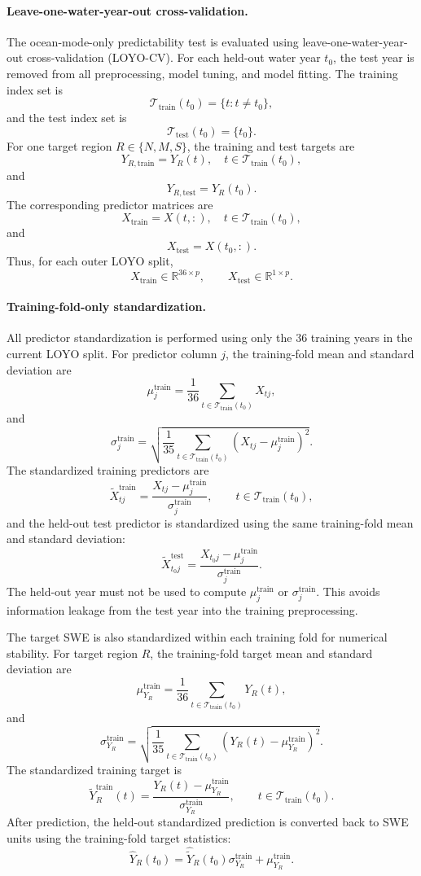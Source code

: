 \documentclass[11pt]{article}
\begin{document}
\paragraph{Leave-one-water-year-out cross-validation.}
The ocean-mode-only predictability test is evaluated using leave-one-water-year-out cross-validation
(LOYO-CV). For each held-out water year $t_0$, the test year is removed from all preprocessing,
model tuning, and model fitting. The training index set is
\[
\mathcal{T}_{\mathrm{train}}(t_0)=\{t: t\neq t_0\},
\]
and the test index set is
\[
\mathcal{T}_{\mathrm{test}}(t_0)=\{t_0\}.
\]
For one target region $R\in\{N,M,S\}$, the training and test targets are
\[
Y_{R,\mathrm{train}}=Y_R(t), \quad t\in \mathcal{T}_{\mathrm{train}}(t_0),
\]
and
\[
Y_{R,\mathrm{test}}=Y_R(t_0).
\]
The corresponding predictor matrices are
\[
X_{\mathrm{train}}=X(t,:), \quad t\in \mathcal{T}_{\mathrm{train}}(t_0),
\]
and
\[
X_{\mathrm{test}}=X(t_0,:).
\]
Thus, for each outer LOYO split,
\[
X_{\mathrm{train}}\in\mathbb{R}^{36\times p},
\qquad
X_{\mathrm{test}}\in\mathbb{R}^{1\times p}.
\]

\paragraph{Training-fold-only standardization.}
All predictor standardization is performed using only the 36 training years in the current LOYO
split. For predictor column $j$, the training-fold mean and standard deviation are
\[
\mu^{\mathrm{train}}_j
=
\frac{1}{36}
\sum_{t\in \mathcal{T}_{\mathrm{train}}(t_0)} X_{tj},
\]
and
\[
\sigma^{\mathrm{train}}_j
=
\sqrt{
\frac{1}{35}
\sum_{t\in \mathcal{T}_{\mathrm{train}}(t_0)}
\left(X_{tj}-\mu^{\mathrm{train}}_j\right)^2
}.
\]
The standardized training predictors are
\[
\widetilde{X}^{\mathrm{train}}_{tj}
=
\frac{X_{tj}-\mu^{\mathrm{train}}_j}{\sigma^{\mathrm{train}}_j},
\qquad
t\in \mathcal{T}_{\mathrm{train}}(t_0),
\]
and the held-out test predictor is standardized using the same training-fold mean and standard
deviation:
\[
\widetilde{X}^{\mathrm{test}}_{t_0j}
=
\frac{X_{t_0j}-\mu^{\mathrm{train}}_j}{\sigma^{\mathrm{train}}_j}.
\]
The held-out year must not be used to compute $\mu^{\mathrm{train}}_j$ or $\sigma^{\mathrm{train}}_j$. This avoids
information leakage from the test year into the training preprocessing.

The target SWE is also standardized within each training fold for numerical stability. For target
region $R$, the training-fold target mean and standard deviation are
\[
\mu^{\mathrm{train}}_{Y_R}
=
\frac{1}{36}
\sum_{t\in \mathcal{T}_{\mathrm{train}}(t_0)} Y_R(t),
\]
and
\[
\sigma^{\mathrm{train}}_{Y_R}
=
\sqrt{
\frac{1}{35}
\sum_{t\in \mathcal{T}_{\mathrm{train}}(t_0)}
\left(Y_R(t)-\mu^{\mathrm{train}}_{Y_R}\right)^2
}.
\]
The standardized training target is
\[
\widetilde{Y}^{\mathrm{train}}_R(t)
=
\frac{Y_R(t)-\mu^{\mathrm{train}}_{Y_R}}{\sigma^{\mathrm{train}}_{Y_R}},
\qquad
t\in \mathcal{T}_{\mathrm{train}}(t_0).
\]
After prediction, the held-out standardized prediction is converted back to SWE units using the
training-fold target statistics:
\[
\widehat{Y}_R(t_0)
=
\widehat{\widetilde{Y}}_R(t_0)\sigma^{\mathrm{train}}_{Y_R}
+
\mu^{\mathrm{train}}_{Y_R}.
\]
\end{document}
